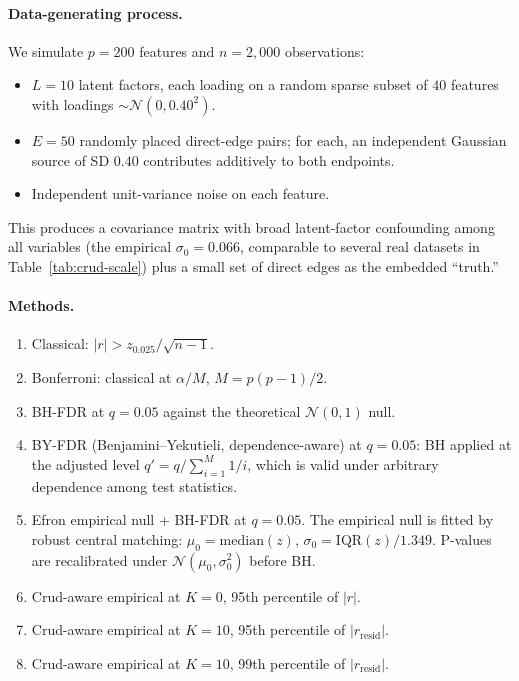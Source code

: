 \paragraph{Data-generating process.} We simulate $p=200$ features and $n=2{,}000$ observations:
\begin{itemize}
\item $L=10$ latent factors, each loading on a random sparse subset of $40$ features with loadings $\sim\mathcal{N}(0,0.40^2)$.
\item $E=50$ randomly placed direct-edge pairs; for each, an independent Gaussian source of SD $0.40$ contributes additively to both endpoints.
\item Independent unit-variance noise on each feature.
\end{itemize}
This produces a covariance matrix with broad latent-factor confounding among all variables (the empirical $\sigma_0=0.066$, comparable to several real datasets in Table~\ref{tab:crud-scale}) plus a small set of direct edges as the embedded ``truth.''

\paragraph{Methods.}
\begin{enumerate}
\item Classical: $|r| > z_{0.025}/\sqrt{n-1}$.
\item Bonferroni: classical at $\alpha/M$, $M=p(p-1)/2$.
\item BH-FDR at $q=0.05$ against the theoretical $\mathcal{N}(0,1)$ null.
\item BY-FDR (Benjamini--Yekutieli, dependence-aware) at $q=0.05$: BH applied at the adjusted level $q'=q/\sum_{i=1}^M 1/i$, which is valid under arbitrary dependence among test statistics.
\item Efron empirical null \citep{efron2004} + BH-FDR at $q=0.05$. The empirical null is fitted by robust central matching: $\mu_0=\mathrm{median}(z)$, $\sigma_0=\mathrm{IQR}(z)/1.349$. P-values are recalibrated under $\mathcal{N}(\mu_0,\sigma_0^2)$ before BH.
\item Crud-aware empirical at $K=0$, 95th percentile of $|r|$.
\item Crud-aware empirical at $K=10$, 95th percentile of $|r_{\mathrm{resid}}|$.
\item Crud-aware empirical at $K=10$, 99th percentile of $|r_{\mathrm{resid}}|$.
\end{enumerate}

